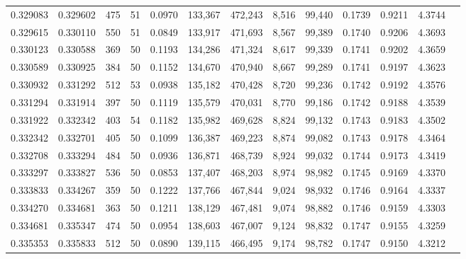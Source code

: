 \begin{tabular}{rrrrrrrrrrrrr}
0.329083 & 0.329602 &   475 &  51 &                                     0.0970 & 133,367 & 472,243 &   8,516 &  99,440 & 0.1739 & 0.9211 & 4.3744 \\
0.329615 & 0.330110 &   550 &  51 &                                     0.0849 & 133,917 & 471,693 &   8,567 &  99,389 & 0.1740 & 0.9206 & 4.3693 \\
0.330123 & 0.330588 &   369 &  50 &                                     0.1193 & 134,286 & 471,324 &   8,617 &  99,339 & 0.1741 & 0.9202 & 4.3659 \\
0.330589 & 0.330925 &   384 &  50 &                                     0.1152 & 134,670 & 470,940 &   8,667 &  99,289 & 0.1741 & 0.9197 & 4.3623 \\
0.330932 & 0.331292 &   512 &  53 &                                     0.0938 & 135,182 & 470,428 &   8,720 &  99,236 & 0.1742 & 0.9192 & 4.3576 \\
0.331294 & 0.331914 &   397 &  50 &                                     0.1119 & 135,579 & 470,031 &   8,770 &  99,186 & 0.1742 & 0.9188 & 4.3539 \\
0.331922 & 0.332342 &   403 &  54 &                                     0.1182 & 135,982 & 469,628 &   8,824 &  99,132 & 0.1743 & 0.9183 & 4.3502 \\
0.332342 & 0.332701 &   405 &  50 &                                     0.1099 & 136,387 & 469,223 &   8,874 &  99,082 & 0.1743 & 0.9178 & 4.3464 \\
0.332708 & 0.333294 &   484 &  50 &                                     0.0936 & 136,871 & 468,739 &   8,924 &  99,032 & 0.1744 & 0.9173 & 4.3419 \\
0.333297 & 0.333827 &   536 &  50 &                                     0.0853 & 137,407 & 468,203 &   8,974 &  98,982 & 0.1745 & 0.9169 & 4.3370 \\
0.333833 & 0.334267 &   359 &  50 &                                     0.1222 & 137,766 & 467,844 &   9,024 &  98,932 & 0.1746 & 0.9164 & 4.3337 \\
0.334270 & 0.334681 &   363 &  50 &                                     0.1211 & 138,129 & 467,481 &   9,074 &  98,882 & 0.1746 & 0.9159 & 4.3303 \\
0.334681 & 0.335347 &   474 &  50 &                                     0.0954 & 138,603 & 467,007 &   9,124 &  98,832 & 0.1747 & 0.9155 & 4.3259 \\
0.335353 & 0.335833 &   512 &  50 &                                     0.0890 & 139,115 & 466,495 &   9,174 &  98,782 & 0.1747 & 0.9150 & 4.3212 \\

\end{tabular}
